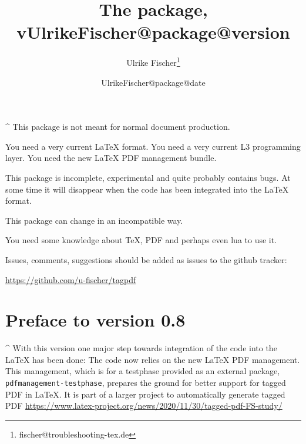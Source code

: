 \documentclass[DIV=12,parskip=half-,bibliography=totoc]{scrartcl}
\title{The \pkg{tagpdf} package, v\csname UlrikeFischer@package@version\endcsname}
\date{\csname UlrikeFischer@package@date\endcsname}
\author{Ulrike Fischer\thanks{fischer@troubleshooting-tex.de}}
\newcommand\PDF{PDF}
\begin{document}

 \maketitle
 \tagmcend
\tagstructend

\begin{tcolorbox}[colframe=red]
\TagP^ This package is not meant for normal document production.

\TagP You need a very current \LaTeX{} format.
      You need a very current L3 programming layer.
      You need the new \LaTeX{} PDF management bundle.

\TagP This package is incomplete, experimental and quite probably contains bugs.
      At some time it will disappear when the code has been integrated into the \LaTeX{} format.

\TagP This package can change in an incompatible way.

\TagP You need some knowledge about \TeX, \PDF{} and perhaps even lua to use it.

\medskip

\TagP Issues, comments, suggestions should be added as issues to the github tracker:\TagPend

\medskip
\centering \url{https://github.com/u-fischer/tagpdf}


\tagstructend
\end{tcolorbox}


\begin{NoHyper} %
\tableofcontents
\end{NoHyper}

\section{Preface to version 0.8}

\TagP^
With this version one major step towards integration of the code into the \LaTeX{} has been done:
The code now relies on the new \LaTeX{} PDF management. This management, which is for a testphase provided
as an external package, \texttt{pdfmanagement-testphase},
prepares the ground for better support for tagged PDF in \LaTeX{}.
It is part of a larger project to automatically generate tagged PDF \url{https://www.latex-project.org/news/2020/11/30/tagged-pdf-FS-study/}
\TagPend
\end{document}
